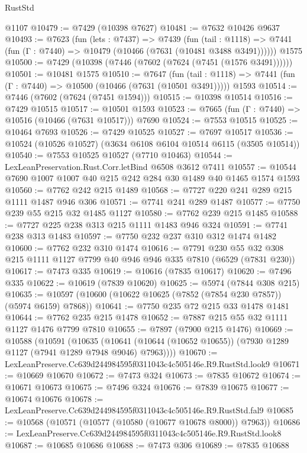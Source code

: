 \begin{lexlean}{RustStd}
\begin{coremodule}
    @1107
@10479 := @7429 (@10398 @7627)
@10481 := @7632 @10426 @9637
@10493 := @7623
    (fun (lets : @7437) =>
    @7439
      (fun (tail : @1118) =>
      @7441 (fun (Γ : @7440) => @10479 (@10466 (@7631 (@10481 @3488 @3491))))))
    @1575
@10500 := @7429 (@10398 (@7446 (@7602 (@7624 (@7451 (@1576 @3491))))))
@10501 := @10481 @1575
@10510 := @7647
    (fun (tail : @1118) => @7441 (fun (Γ : @7440) => @10500 (@10466 (@7631 (@10501 @3491)))))
    @1593
@10514 := @7446 (@7602 (@7624 (@7451 @1594)))
@10515 := @10398 @10514
@10516 := @7429 @10515
@10517 := @10501 @1593
@10523 := @7665 (fun (Γ : @7440) => @10516 (@10466 (@7631 @10517))) @7690
@10524 := @7553 @10515
@10525 := @10464 @7693
@10526 := @7429 @10525
@10527 := @7697 @10517
@10536 := @10524 (@10526 @10527) (@3634 @6108 @6104 @10514 @6115 (@3505 @10514))
@10540 := @7553 @10525 @10527 (@7710 @10463)
@10544 := LexLeanPreservation.Rust.Corr.letBind @6508 @3612 @7411
@10557 := @10544 @7690 @1007 @1007 @40 @215 @242 @284 @30 @1489 @40 @1465 @1574 @1593
@10560 := @7762 @242 @215 @1489
@10568 := @7727 @220 @241 @289 @215 @1111 @1487 @946 @306
@10571 := @7741 @241 @289 @1487
@10577 := @7750 @239 @55 @215 @32 @1485 @1127
@10580 := @7762 @239 @215 @1485
@10588 := @7727 @225 @238 @313 @215 @1111 @1483 @946 @324
@10591 := @7741 @238 @313 @1483
@10597 := @7750 @232 @237 @310 @312 @1474 @1482
@10600 := @7762 @232 @310 @1474
@10616 := @7791
    @230
    @55
    @32
    @308
    @215
    @1111
    @1127
    @7799
    @40
    @946
    @946
    @335
    @7810
    (@6529 (@7831 @230))
@10617 := @7473 @335
@10619 := @10616 (@7835 @10617)
@10620 := @7496 @335
@10622 := @10619 (@7839 @10620)
@10625 := @5974 (@7844 @308 @215)
@10635 := @10597 (@10600 (@10622 @10625 (@7852 (@7854 @230 @7857)) (@5974 @6159) @7868))
@10641 := @7750 @235 @72 @215 @33 @1478 @1481
@10644 := @7762 @235 @215 @1478
@10652 := @7887 @215 @55 @32 @1111 @1127 @1476 @7799 @7810
@10655 := @7897 (@7900 @215 @1476)
@10669 := @10588
    (@10591
      (@10635
        (@10641 (@10644 (@10652 @10655)) (@7930 @1289 @1127 (@7941 @1289 @7948 @9046) @7963))))
@10670 := LexLeanPreserve.Cc639d244984595f0311043c4c505146e.R9.RustStd.look9
@10671 := @10669 @10670
@10672 := @7473 @324
@10673 := @7835 @10672
@10674 := @10671 @10673
@10675 := @7496 @324
@10676 := @7839 @10675
@10677 := @10674 @10676
@10678 := LexLeanPreserve.Cc639d244984595f0311043c4c505146e.R9.RustStd.fal9
@10685 := @10568 (@10571 (@10577 (@10580 (@10677 @10678 @8000)) @7963))
@10686 := LexLeanPreserve.Cc639d244984595f0311043c4c505146e.R9.RustStd.look8
@10687 := @10685 @10686
@10688 := @7473 @306
@10689 := @7835 @10688

\end{coremodule}
\end{lexlean}
